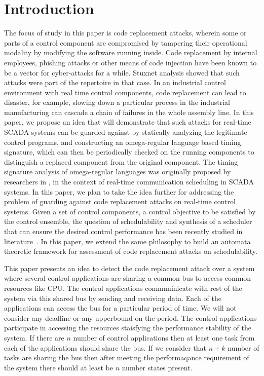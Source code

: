 \section{Introduction} \label{sec:intro}
\noindent

The focus of study in this paper is code replacement attacks, wherein some or parts of a
control component 
are compromised by tampering their operational modality 
by modifying the software running inside. 
Code replacement \cite{GhoshHD12} by internal employees, phishing attacks or other means of 
code injection have been known to be a vector for cyber-attacks for a while. Stuxnet 
analysis showed that such attacks were part of the repertoire in that case. In an 
industrial control environment with real time control components, code replacement can
lead to disaster, for example, slowing down a particular process in the industrial
manufacturing can cascade a chain of failures in the whole assembly line. 
In this paper, we propose an idea that will demonstrate that such
attacks for real-time SCADA systems can be guarded against by statically analyzing the
legitimate control programs, and constructing an omega-regular language based timing signature,
which can then be periodically checked on the running components to distinguish a replaced
component from the original component. The timing signature analysis of omega-regular languages 
was originally proposed by researchers in \cite{WeissFAA09}, in the context of real-time 
communication scheduling in SCADA systems. In this paper, we plan to take the idea further 
for addressing the problem of guarding against code replacement attacks on real-time 
control systems. Given a set of control components, a control objective 
to be satisfied by the control ensemble, the question of schedulability and 
synthesis of a scheduler that can ensure the desired control performance has been
recently studied in literature~\cite{WeissFAA09, AlurW08, GhoshMDHD16}. 
In this paper, we extend the same philosophy to build an automata theoretic
framework for assessment of code replacement attacks on schedulability.


This paper presents an idea to detect the code replacement attack over a system
where several control applications are sharing a common bus to access common resources 
like CPU. The control applications communinicate with rest of the system via this shared 
bus by sending and receiving data. Each of the applications can access the bus for a
particular period of time. We will not consider any deadline or any upperbound on the 
period. The control applications participate in accessing the resources staisfying the
performance stability of the system. If there are $n$ number of control applications then
at least one task from each of the applications should share the bus. If we consider that
$n + k$ number of tasks are sharing the bus then after meeting the performaqance requirement
of the system there should at least be $n$ number states present.

